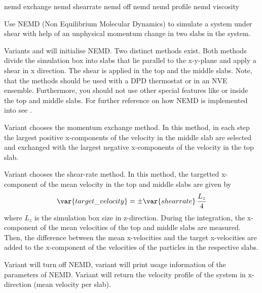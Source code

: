 \begin{essyntax}
  nemd exchange  
  nemd shearrate  
  nemd off
  nemd
  nemd profile
  nemd viscosity
  \begin{features}
  \end{features}
\end{essyntax}

Use NEMD (Non Equilibrium Molecular Dynamics) to simulate a system
under shear with help of an unphysical momentum change in two slabs in
the system.

Variants  and  will initialise NEMD. Two
distinct methods exist.  Both methods divide the simulation box into
 slabs that lie parallel to the x-y-plane and apply a
shear in x direction.  The shear is applied in the top and the middle
slabs. Note, that the methods should be used with a DPD thermostat or
in an NVE ensemble.  Furthermore, you should not use other special
features like  or  inside the
top and middle slabs. For further reference on how NEMD is implemented
into \es see \cite{soddeman01a}.


Variant  chooses the momentum exchange method.  In this
method, in each step the  largest positive
x-components of the velocity in the middle slab are selected and
exchanged with the  largest negative x-components of
the velocity in the top slab. 

Variant  chooses the shear-rate method. In this method, the
targetted x-component of the mean velocity in the top and middle slabs
are given by 
\begin{equation}
  \var{target\_velocity} = \pm \var{shearrate}\,\frac{L_z}{4}
\end{equation}
where $L_z$ is the simulation box size in z-direction. During the
integration, the x-component of the mean velocities of the top and
middle slabs are measured.  Then, the difference between the mean
x-velocities and the target x-velocities are added to the x-component
of the velocities of the particles in the respective slabs. 

Variant  will turn off NEMD, variant  will
print usage information of the parameters of NEMD. Variant  will return the
velocity profile of the system in x-direction (mean velocity per slab).

